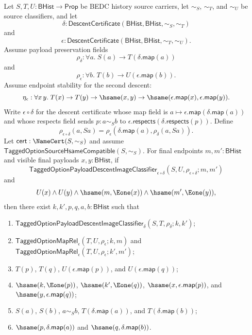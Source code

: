 \begin{theorem}
Let $S,T,U:\mathsf{BHist}\to\mathsf{Prop}$ be BEDC history source carriers, let
$\sim_S$, $\sim_T$, and $\sim_U$ be source classifiers, and let
$$
\delta:\mathsf{DescentCertificate}(\mathsf{BHist},\mathsf{BHist},\sim_S,\sim_T)
$$
and
$$
\epsilon:\mathsf{DescentCertificate}(\mathsf{BHist},\mathsf{BHist},\sim_T,\sim_U).
$$
Assume payload preservation fields
$$
\rho_{\delta}:\forall a.\;S(a)\to T(\delta.\mathsf{map}(a))
$$
and
$$
\rho_{\epsilon}:\forall b.\;T(b)\to U(\epsilon.\mathsf{map}(b)).
$$
Assume endpoint stability for the second descent:
$$
\eta_{\epsilon}:\forall x\,y.\;
T(x)\to T(y)\to \hsame(x,y)\to
\hsame(\epsilon.\mathsf{map}(x),\epsilon.\mathsf{map}(y)).
$$
Write $\epsilon\circ\delta$ for the descent certificate whose map field is
$a\mapsto\epsilon.\mathsf{map}(\delta.\mathsf{map}(a))$ and whose respects field
sends $p:a\sim_S b$ to
$\epsilon.\mathsf{respects}(\delta.\mathsf{respects}(p))$. Define
$$
\rho_{\epsilon\circ\delta}(a,Sa)=
\rho_{\epsilon}(\delta.\mathsf{map}(a),\rho_{\delta}(a,Sa)).
$$
Let $\mathsf{cert}:\NameCert(S,\sim_S)$ and assume
$\mathsf{TaggedOptionSourceHsameCompatible}(S,\sim_S)$. For final endpoints
$m,m':\mathsf{BHist}$ and visible final payloads $x,y:\mathsf{BHist}$, if
$$
\mathsf{TaggedOptionPayloadDescentImageClassifier}_{\epsilon\circ\delta}
(S,U,\rho_{\epsilon\circ\delta};m,m')
$$
and
$$
U(x)\land U(y)\land
\hsame(m,\Eone(x))\land
\hsame(m',\Eone(y)),
$$
then there exist $k,k',p,q,a,b:\mathsf{BHist}$ such that
\begin{enumerate}
\item $\mathsf{TaggedOptionPayloadDescentImageClassifier}_{\delta}
(S,T,\rho_{\delta};k,k')$;
\item $\mathsf{TaggedOptionMapRel}_{\epsilon}(T,U,\rho_{\epsilon};k,m)$ and
$\mathsf{TaggedOptionMapRel}_{\epsilon}(T,U,\rho_{\epsilon};k',m')$;
\item $T(p)$, $T(q)$, $U(\epsilon.\mathsf{map}(p))$, and
$U(\epsilon.\mathsf{map}(q))$;
\item $\hsame(k,\Eone(p))$, $\hsame(k',\Eone(q))$,
$\hsame(x,\epsilon.\mathsf{map}(p))$, and
$\hsame(y,\epsilon.\mathsf{map}(q))$;
\item $S(a)$, $S(b)$, $a\sim_S b$,
$T(\delta.\mathsf{map}(a))$, and $T(\delta.\mathsf{map}(b))$;
\item $\hsame(p,\delta.\mathsf{map}(a))$ and
$\hsame(q,\delta.\mathsf{map}(b))$.
\end{enumerate}
\end{theorem}
